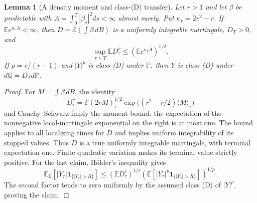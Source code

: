 \documentclass[11pt]{article}
\newtheorem{lemma}[theorem]{Lemma}
\newcommand{\E}{\mathbb E}
\newcommand{\Prb}{\mathbb P}
\newcommand{\Q}{\mathbb Q}
\newcommand{\Ind}{\mathbf 1}
\begin{document}
\begin{lemma}[A density moment and class-(D) transfer]\label{density}
Let $r>1$ and let $\beta$ be predictable with
$A=\int_0^T|\beta_s|^2ds<\infty$ almost surely. Put
$\kappa_r=2r^2-r$. If $\E e^{\kappa_r A}<\infty$, then
$D=\mathcal E(\int\beta\,dB)$ is a uniformly integrable martingale,
$D_T>0$, and
\[
 \sup_{\tau\leq T}\E D_\tau^r\leq(\E e^{\kappa_r A})^{1/2}.
\]
If $p=r/(r-1)$ and $|Y|^p$ is class (D) under $\Prb$, then $Y$
is class (D) under $d\Q=D_Td\Prb$.
\end{lemma}
\begin{proof}
For $M=\int\beta\,dB$, the identity
\[
 D_\tau^r=\mathcal E(2rM)_\tau^{1/2}
          \exp\bigl((r^2-r/2)\langle M\rangle_\tau\bigr)
\]
and Cauchy--Schwarz imply the moment bound: the expectation of the
nonnegative local-martingale exponential on the right is at most one.
The bound applies to all localizing times for $D$ and implies uniform
integrability of its stopped values. Thus $D$ is a true uniformly
integrable martingale, with terminal expectation one. Finite quadratic
variation makes its terminal value strictly positive. For the last claim,
H\"older's inequality gives
\[
 \E_\Q[|Y_\tau|\Ind_{\{|Y_\tau|>R\}}]
 \leq (\E D_\tau^r)^{1/r}
       (\E[|Y_\tau|^p\Ind_{\{|Y_\tau|>R\}}])^{1/p}.
\]
The second factor tends to zero uniformly by the assumed class (D) of
$|Y|^p$, proving the claim.
\end{proof}
\end{document}
